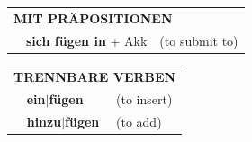 \documentclass[10pt,a4paper]{revtex4-2}
\begin{document}
\begin{verbbox}
\vspace{10pt}

\begin{tabular}{lll}
\multicolumn{3}{l}{\textbf{MIT PRÄPOSITIONEN}}\\
& \textbf{sich fügen in} + Akk & (to submit to)\\
\end{tabular}
\hfill
\begin{tabular}{lll}
\multicolumn{3}{l}{\textbf{TRENNBARE VERBEN}}\\
& \textbf{ein$|$fügen} & (to insert)\\
& \textbf{hinzu$|$fügen} & (to add)\\
\end{tabular}

\vspace{-5pt}
\end{verbbox}
\end{document}

